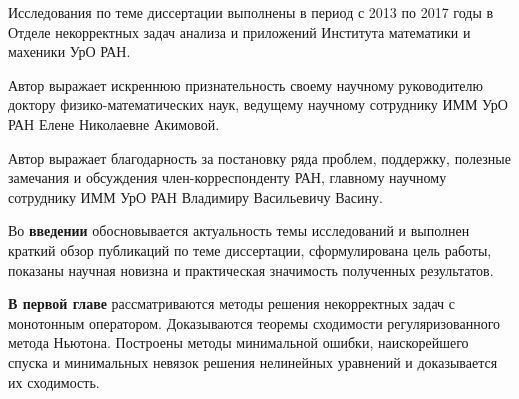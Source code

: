 \documentclass[%
autoref,     %
href,        %
facsimile,   %
colorlinks,  %
]{disser}
\begin{document}

\approbationsection
\approbationtext

\pubsection
\pubtext

\contribsection
\contribtext

\structsection
\structtext

Исследования по теме диссертации выполнены в период с 2013 по 2017 годы в Отделе некорректных задач анализа и приложений Института математики и махеники УрО РАН.

Автор выражает искреннюю признательность своему научному руководителю доктору физико-математических наук, ведущему научному сотруднику ИММ УрО РАН Елене Николаевне Акимовой.

Автор выражает благодарность за постановку ряда проблем, поддержку, полезные замечания и обсуждения член-корреспонденту РАН, главному научному сотруднику ИММ УрО РАН Владимиру Васильевичу Васину.


Во \textbf{введении} обосновывается актуальность темы исследований и выполнен краткий обзор публикаций по теме диссертации, сформулирована цель работы, показаны научная новизна и практическая значимость полученных результатов.

\textbf{В первой главе} рассматриваются методы решения некорректных задач с монотонным оператором. Доказываются теоремы сходимости  регуляризованного метода Ньютона. Построены методы минимальной ошибки, наискорейшего спуска и минимальных невязок решения нелинейных уравнений и доказывается их сходимость.
\end{document}
